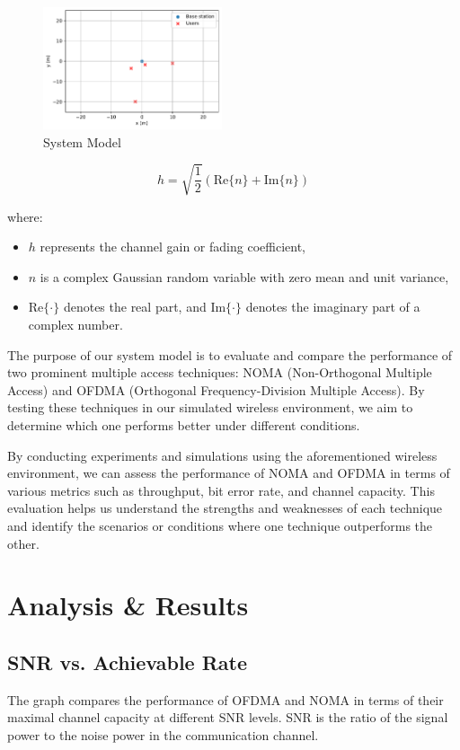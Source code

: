 \documentclass[conference]{IEEEtran}
\begin{document}
\begin{figure}[t!]
    \centering
    \includegraphics[width=0.47\textwidth, height= 0.35\textwidth]{figures/system_model.pdf}
    \caption{System Model}
\end{figure}

\[
h = \sqrt{\frac{1}{2}} \left( \text{Re}\{n\} + \text{Im}\{n\} \right)
\]

where:
\begin{itemize}
  \item $h$ represents the channel gain or fading coefficient,
  \item $n$ is a complex Gaussian random variable with zero mean and unit variance,
  \item $\text{Re}\{\cdot\}$ denotes the real part, and $\text{Im}\{\cdot\}$ denotes the imaginary part of a complex number.
\end{itemize}

The purpose of our system model is to evaluate and compare the performance of two prominent multiple access techniques: NOMA (Non-Orthogonal Multiple Access) and OFDMA (Orthogonal Frequency-Division Multiple Access). By testing these techniques in our simulated wireless environment, we aim to determine which one performs better under different conditions.

By conducting experiments and simulations using the aforementioned wireless environment, we can assess the performance of NOMA and OFDMA in terms of various metrics such as throughput, bit error rate, and channel capacity. This evaluation helps us understand the strengths and weaknesses of each technique and identify the scenarios or conditions where one technique outperforms the other.

\section{Analysis \& Results}

\subsection{SNR vs. Achievable Rate}
The graph compares the performance of OFDMA and NOMA in terms of their maximal channel capacity at different SNR levels. SNR is the ratio of the signal power to the noise power in the communication channel.
\end{document}
